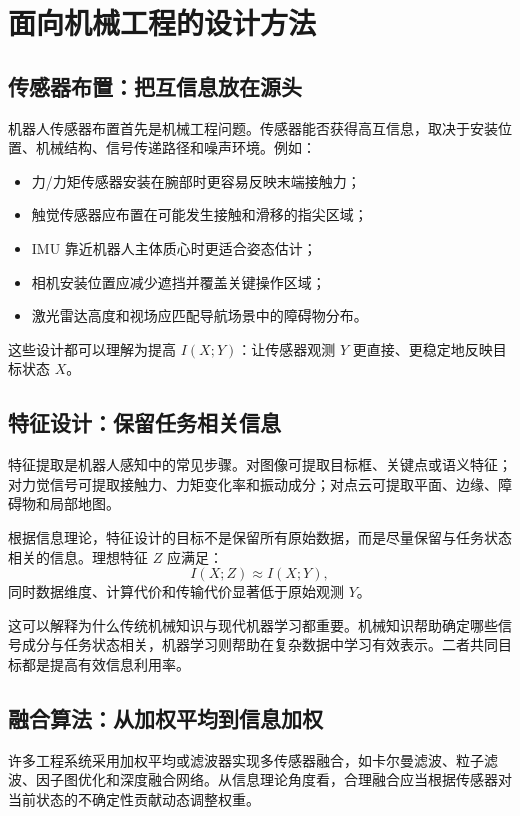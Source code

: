 \documentclass[UTF8,a4paper,12pt]{ctexart}
\begin{document}
\section{面向机械工程的设计方法}

\subsection{传感器布置：把互信息放在源头}

机器人传感器布置首先是机械工程问题。传感器能否获得高互信息，取决于安装位置、机械结构、信号传递路径和噪声环境。例如：
\begin{itemize}
  \item 力/力矩传感器安装在腕部时更容易反映末端接触力；
  \item 触觉传感器应布置在可能发生接触和滑移的指尖区域；
  \item IMU 靠近机器人主体质心时更适合姿态估计；
  \item 相机安装位置应减少遮挡并覆盖关键操作区域；
  \item 激光雷达高度和视场应匹配导航场景中的障碍物分布。
\end{itemize}

这些设计都可以理解为提高 $I(X;Y)$：让传感器观测 $Y$ 更直接、更稳定地反映目标状态 $X$。

\subsection{特征设计：保留任务相关信息}

特征提取是机器人感知中的常见步骤。对图像可提取目标框、关键点或语义特征；对力觉信号可提取接触力、力矩变化率和振动成分；对点云可提取平面、边缘、障碍物和局部地图。

根据信息理论，特征设计的目标不是保留所有原始数据，而是尽量保留与任务状态相关的信息。理想特征 $Z$ 应满足：
\begin{equation}
I(X;Z)\approx I(X;Y),
\end{equation}
同时数据维度、计算代价和传输代价显著低于原始观测 $Y$。

这可以解释为什么传统机械知识与现代机器学习都重要。机械知识帮助确定哪些信号成分与任务状态相关，机器学习则帮助在复杂数据中学习有效表示。二者共同目标都是提高有效信息利用率。

\subsection{融合算法：从加权平均到信息加权}

许多工程系统采用加权平均或滤波器实现多传感器融合，如卡尔曼滤波、粒子滤波、因子图优化和深度融合网络。从信息理论角度看，合理融合应当根据传感器对当前状态的不确定性贡献动态调整权重。
\end{document}
